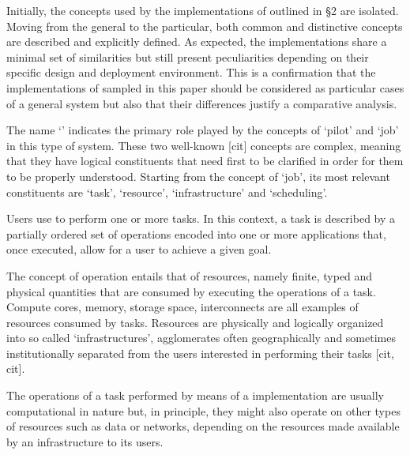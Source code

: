 \documentclass{sig-alternate}
\begin{document}

Initially, the concepts used by the implementations of \pilotjob
outlined in \S 2 are isolated. Moving from the general to the
particular, both common and distinctive concepts are described and
explicitly defined. As expected, the \pilotjob implementations share a
minimal set of similarities but still present peculiarities depending on
their specific design and deployment environment. This is a confirmation
that the implementations of \pilotjob sampled in this paper should be
considered as particular cases of a general \pilotjob system but also
that their differences justify a comparative analysis.


The name `\pilotjob' indicates the primary role played by the concepts
of `pilot' and `job' in this type of system. These two well-known
[cit] concepts are complex, meaning that they have logical constituents
that need first to be clarified in order for them to be properly
understood. Starting from the concept of `job', its most relevant
constituents are `task', `resource', `infrastructure' and
`scheduling'.


Users use \pilotjobs to perform one or more tasks. In this context, a
task is described by a partially ordered set of operations encoded into
one or more applications that, once executed, allow for a user to
achieve a given goal. 


The concept of operation entails that of resources, namely finite, typed
and physical quantities that are consumed by executing the operations of
a task. Compute cores, memory, storage space,  interconnects are all
examples of resources consumed by tasks. Resources are physically and
logically organized into so called `infrastructures', agglomerates
often geographically and sometimes institutionally separated from the
users interested in performing their tasks [cit, cit]. 


The operations of a task performed by means of a \pilotjob
implementation are usually computational in nature but, in principle,
they might also operate on other types of resources such as data or
networks, depending on the resources made available by an infrastructure
to its users.
\end{document}

